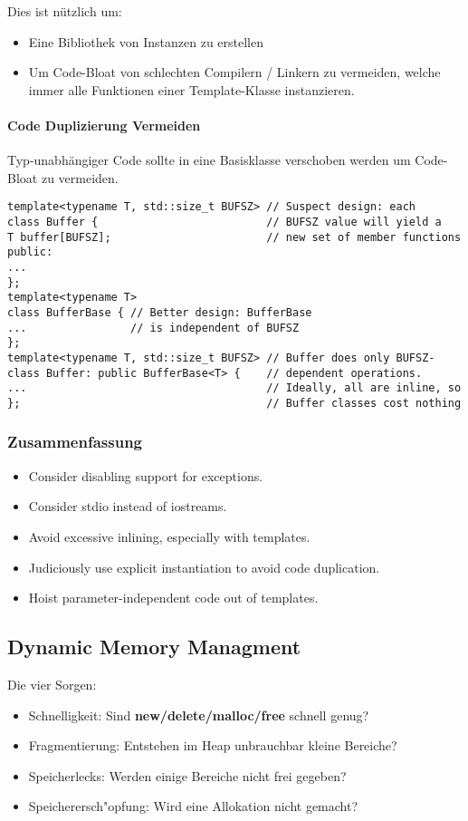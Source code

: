 Dies ist nützlich um:
\begin{itemize}
	\item Eine Bibliothek von Instanzen zu erstellen
	\item Um Code-Bloat von schlechten Compilern / Linkern zu vermeiden, welche immer alle Funktionen einer Template-Klasse instanzieren.
\end{itemize}

\paragraph{Code Duplizierung Vermeiden}
Typ-unabhängiger Code sollte in eine Basisklasse verschoben werden um
Code-Bloat zu vermeiden.
\begin{lstlisting}
template<typename T, std::size_t BUFSZ> // Suspect design: each
class Buffer {                          // BUFSZ value will yield a
T buffer[BUFSZ];                        // new set of member functions
public:
...
};
template<typename T>
class BufferBase { // Better design: BufferBase
...                // is independent of BUFSZ
};
template<typename T, std::size_t BUFSZ> // Buffer does only BUFSZ-
class Buffer: public BufferBase<T> {    // dependent operations.
...                                     // Ideally, all are inline, so
};                                      // Buffer classes cost nothing
\end{lstlisting}

\subsubsection{Zusammenfassung}
\begin{itemize}
\item Consider disabling support for exceptions.
\item Consider stdio instead of iostreams.
\item Avoid excessive inlining, especially with templates.
\item Judiciously use explicit instantiation to avoid code duplication.
\item Hoist parameter-independent code out of templates.
\end{itemize}

\subsection{Dynamic Memory Managment}
Die vier Sorgen:
\begin{itemize}
\item Schnelligkeit: Sind \textbf{new/delete/malloc/free} schnell genug?
\item Fragmentierung: Entstehen im Heap unbrauchbar kleine Bereiche?
\item Speicherlecks: Werden einige Bereiche nicht frei gegeben?
\item Speicherersch"opfung: Wird eine Allokation nicht gemacht?
\end{itemize}

